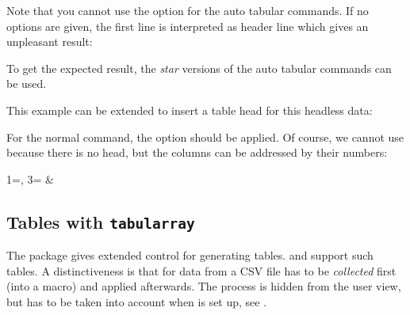 \documentclass[a4paper,11pt]{ltxdoc}
\begin{document}

Note that you cannot use the  option for the auto tabular
commands.
If no options are given, the first line is interpreted as header line
which gives an unpleasant result:

\begin{dispExample}
\end{dispExample}

To get the expected result, the \emph{star} versions of the auto tabular
commands can be used.

\begin{dispExample}
\end{dispExample}

This example can be extended to insert a table head for this headless data:

\begin{dispExample}
\end{dispExample}


\clearpage

For the normal  command, the  option
should be applied. Of course, we cannot use 
because there is no head, but the columns can be addressed by their numbers:

\begin{dispExample}
  { 1=\land, 3=\amount }
  {\land & \amount}
\end{dispExample}



\clearpage
\subsection{Tables with \texttt{tabularray}}\label{sec:tabularray}%

The  package gives extended control for generating
tables.  and 
support such tables. A distinctiveness is that for 
data from a CSV file has to be \emph{collected} first (into a macro)
and applied afterwards. The process is hidden from the user view, but
has to be taken into account when  is set up,
see .
\end{document}
